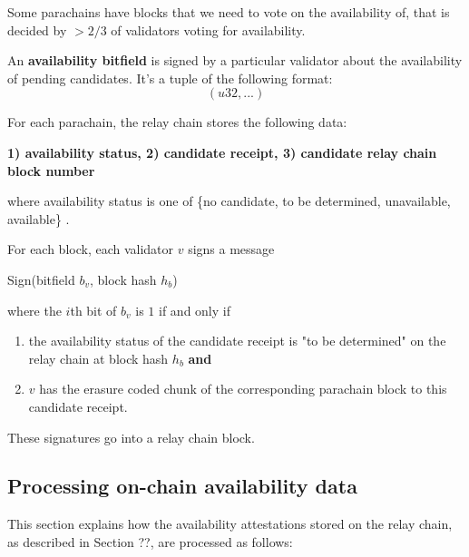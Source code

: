 Some parachains have blocks that we need to vote on the availability of, that is
decided by $> 2/3$ of validators voting for availability. 
\newline

\begin{definition}
  \label{defn-availability-bitfield}
  An \textbf{availability bitfield} is signed by a particular validator about the availability
  of pending candidates. It's a tuple of the following format:
  \[
    (u32, ...)
  \]
\end{definition}

For each parachain, the relay chain stores the following data:

\textbf{1) availability status, 2) candidate receipt, 3) candidate relay chain block number}

where availability status is one of \{no candidate, to be determined,
unavailable, available\} .

For each block, each validator $v$ signs a message

Sign(bitfield $b_v$, block hash $h_b$)

where the $i$th bit of $b_v$ is $1$ if and only if

\begin{enumerate}
\item the availability status of the candidate receipt is "to be determined" on
the relay chain at block hash $h_b$ \textbf{and}

\item $v$ has the erasure coded chunk of the corresponding parachain block to
this candidate receipt.
\end{enumerate}

These signatures go into a relay chain block.

\subsection{Processing on-chain availability data}
This section explains how the availability attestations stored on the relay
chain, as described in Section ??, are processed as follows:

